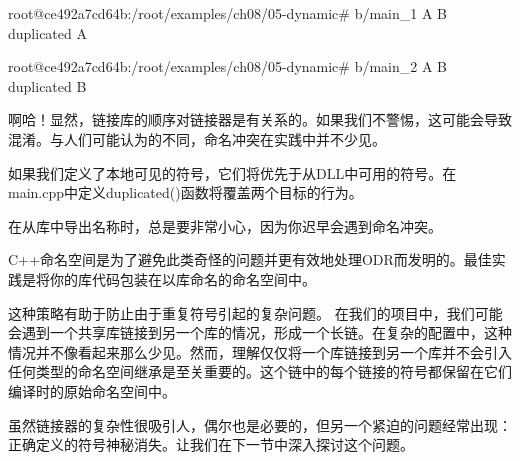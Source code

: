 \begin{shell}
root@ce492a7cd64b:/root/examples/ch08/05-dynamic# b/main_1
A
B
duplicated A

root@ce492a7cd64b:/root/examples/ch08/05-dynamic# b/main_2
A
B
duplicated B
\end{shell}

啊哈！显然，链接库的顺序对链接器是有关系的。如果我们不警惕，这可能会导致混淆。与人们可能认为的不同，命名冲突在实践中并不少见。

如果我们定义了本地可见的符号，它们将优先于从DLL中可用的符号。在main.cpp中定义duplicated()函数将覆盖两个目标的行为。

在从库中导出名称时，总是要非常小心，因为你迟早会遇到命名冲突。


C++命名空间是为了避免此类奇怪的问题并更有效地处理ODR而发明的。最佳实践是将你的库代码包装在以库命名的命名空间中。

这种策略有助于防止由于重复符号引起的复杂问题。 在我们的项目中，我们可能会遇到一个共享库链接到另一个库的情况，形成一个长链。在复杂的配置中，这种情况并不像看起来那么少见。然而，理解仅仅将一个库链接到另一个库并不会引入任何类型的命名空间继承是至关重要的。这个链中的每个链接的符号都保留在它们编译时的原始命名空间中。

虽然链接器的复杂性很吸引人，偶尔也是必要的，但另一个紧迫的问题经常出现：正确定义的符号神秘消失。让我们在下一节中深入探讨这个问题。



